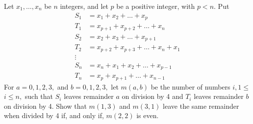 \documentclass{pset}
\begin{document}
\begin{problems}
\begin{problem}[1988 Q14]
    Let \(x_{1}, \ldots, x_{n}\) be \(n\) integers, and let \(p\) be a positive integer, with \(p<n .\) Put
    $$
    \begin{aligned}
    S_{1} &=x_{1}+x_{2}+\ldots+x_{p} \\
    T_{1} &=x_{p+1}+x_{p+2}+\ldots+x_{n} \\
    S_{2} &=x_{2}+x_{3}+\ldots+x_{p+1} \\
    T_{2} &=x_{p+2}+x_{p+3}+\ldots+x_{n}+x_{1} \\
    \vdots \\
    S_{n} &=x_{n}+x_{1}+x_{2}+\ldots+x_{p-1} \\
    T_{n} &=x_{p}+x_{p+1}+\ldots+x_{n-1}
    \end{aligned}
    $$
    For \(a=0,1,2,3,\) and \(b=0,1,2,3,\) let \(m(a, b)\) be the number of numbers \(i, 1 \leq\) \(i \leq n,\) such that \(S_{i}\) leaves remainder \(a\) on division by 4 and \(T_{i}\) leaves remainder \(b\) on division by 4. Show that \(m(1,3)\) and \(m(3,1)\) leave the same remainder when divided by 4 if, and only if, \(m(2,2)\) is even.
\end{problem}

\end{problems}
\end{document}
